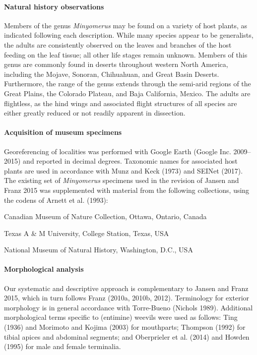 \documentclass[fleqn,10pt,lineno]{wlpeerj} %
\begin{document}
	\paragraph{Natural history observations} 
		Members of the genus \textit{Minyomerus} may be found on a variety of host plants, as indicated following each description.
		While many species appear to be generalists, the adults are consistently observed on the leaves and branches of the host feeding on the leaf tissue; all other life stages remain unknown.
		Members of this genus are commonly found in deserts throughout western North America, including the Mojave, Sonoran, Chihuahuan, and Great Basin Deserts. 
		Furthermore, the range of the genus extends through the semi-arid regions of the Great Plains, the Colorado Plateau, and Baja California, Mexico. 
		The adults are flightless, as the hind wings and associated flight structures of all species are either greatly reduced or not readily apparent in dissection.

	\paragraph{Acquisition of museum specimens} 
		Georeferencing of localities was performed with Google Earth (Google Inc. 2009–2015) and reported in decimal degrees.
		Taxonomic names for associated host plants are used in accordance with Munz and Keck (1973) and SEINet (2017).
		The existing set of \textit{Minyomerus} specimens used in the revision of Jansen and Franz 2015 was supplemented with material from the following collections, using the codens of Arnett et al. (1993):
		
		\begin{description}[itemsep=-1ex]
			\item[\texttt{CMNC}] Canadian Museum of Nature Collection, Ottawa, Ontario, Canada
			\item[\texttt{TAMU}] Texas A \& M University, College Station, Texas, USA
			\item[\texttt{USNM}] National Museum of Natural History, Washington, D.C., USA
		\end{description}
		
	\paragraph{Morphological analysis}
		Our systematic and descriptive approach is complementary to Jansen and Franz 2015, which in turn follows Franz (2010a, 2010b, 2012).
		Terminology for exterior morphology is in general accordance with Torre-Bueno (Nichols 1989).
		Additional morphological terms specific to (entimine) weevils were used as follows:
			Ting (1936) and Morimoto and Kojima (2003) for mouthparts;
			Thompson (1992) for tibial apices and abdominal segments;
			and Oberprieler et al. (2014) and Howden (1995) for male and female terminalia.
		
\end{document}
